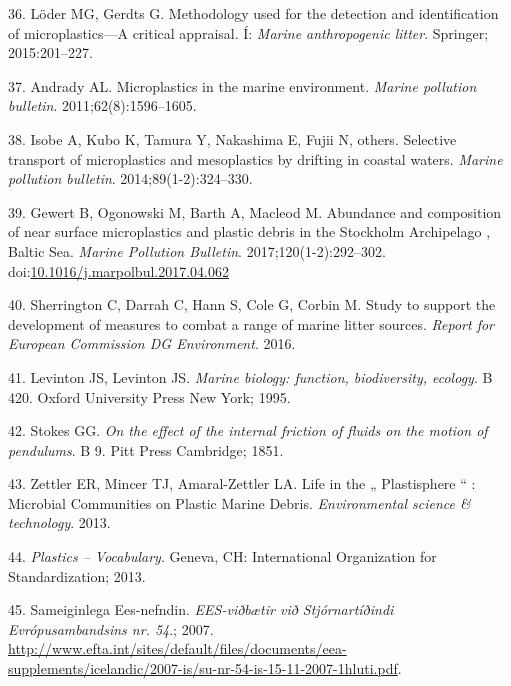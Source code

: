 \documentclass[icelandic,]{book}
\begin{document}
\leavevmode\hypertarget{ref-loder2015methodology}{}%
36. Löder MG, Gerdts G. Methodology used for the detection and identification of microplastics---A critical appraisal. Í: \emph{Marine anthropogenic litter}. Springer; 2015:201--227.

\leavevmode\hypertarget{ref-andrady2011microplastics}{}%
37. Andrady AL. Microplastics in the marine environment. \emph{Marine pollution bulletin}. 2011;62(8):1596--1605.

\leavevmode\hypertarget{ref-isobe2014selective}{}%
38. Isobe A, Kubo K, Tamura Y, Nakashima E, Fujii N, others. Selective transport of microplastics and mesoplastics by drifting in coastal waters. \emph{Marine pollution bulletin}. 2014;89(1-2):324--330.

\leavevmode\hypertarget{ref-Gewert2017}{}%
39. Gewert B, Ogonowski M, Barth A, Macleod M. Abundance and composition of near surface microplastics and plastic debris in the Stockholm Archipelago , Baltic Sea. \emph{Marine Pollution Bulletin}. 2017;120(1-2):292--302. doi:\href{https://doi.org/10.1016/j.marpolbul.2017.04.062}{10.1016/j.marpolbul.2017.04.062}

\leavevmode\hypertarget{ref-sherrington2016study}{}%
40. Sherrington C, Darrah C, Hann S, Cole G, Corbin M. Study to support the development of measures to combat a range of marine litter sources. \emph{Report for European Commission DG Environment}. 2016.

\leavevmode\hypertarget{ref-levinton1995marine}{}%
41. Levinton JS, Levinton JS. \emph{Marine biology: function, biodiversity, ecology}. B 420. Oxford University Press New York; 1995.

\leavevmode\hypertarget{ref-stokes1851effect}{}%
42. Stokes GG. \emph{On the effect of the internal friction of fluids on the motion of pendulums}. B 9. Pitt Press Cambridge; 1851.

\leavevmode\hypertarget{ref-Zettler2013}{}%
43. Zettler ER, Mincer TJ, Amaral-Zettler LA. Life in the „ Plastisphere `` : Microbial Communities on Plastic Marine Debris. \emph{Environmental science \& technology}. 2013.

\leavevmode\hypertarget{ref-ISO472}{}%
44. \emph{Plastics -- Vocabulary}. Geneva, CH: International Organization for Standardization; 2013.

\leavevmode\hypertarget{ref-SameiginlegaEes-nefndin2007}{}%
45. Sameiginlega Ees-nefndin. \emph{EES-viðbætir við Stjórnartíðindi Evrópusambandsins nr. 54}.; 2007. \url{http://www.efta.int/sites/default/files/documents/eea-supplements/icelandic/2007-is/su-nr-54-is-15-11-2007-1hluti.pdf}.
\end{document}
